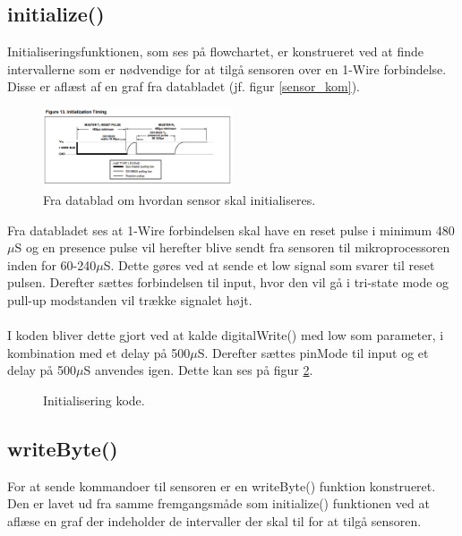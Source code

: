 \newpage
\subsection{initialize()}
Initialiseringsfunktionen, som ses på flowchartet, er konstrueret ved at finde intervallerne som er nødvendige for at tilgå sensoren over en 1-Wire forbindelse. Disse er aflæst af en graf fra databladet (jf. figur \ref{sensor_kom}).




\begin{figure}[h!]
  \centering
  \includegraphics[width=0.5\textwidth]{figures/Initialization_timing.png}
  \caption{Fra datablad om hvordan sensor skal initialiseres.}
  \label{sensor_init}
\end{figure}

Fra databladet ses at 1-Wire forbindelsen skal have en reset pulse i minimum 480$\mu$S og en presence pulse vil herefter blive sendt fra sensoren til mikroprocessoren inden for 60-240$\mu$S. Dette gøres ved at sende et low signal som svarer til reset pulsen. Derefter sættes forbindelsen til input, hvor den vil gå i tri-state mode og pull-up modstanden vil trække signalet højt. 
\\
\\
I koden bliver dette gjort ved at kalde digitalWrite() med low som parameter, i kombination med et delay på 500$\mu$S. Derefter sættes pinMode til input og et delay på 500$\mu$S anvendes igen. Dette kan ses på figur \ref{sensor_kode}.

\begin{figure}[h!]
  \centering
  \caption{Initialisering kode.}
  \label{sensor_kode}
\end{figure}

\subsection{writeByte()}
For at sende kommandoer til sensoren er en writeByte() funktion konstrueret. Den er lavet ud fra samme fremgangsmåde som initialize() funktionen ved at aflæse en graf der indeholder de intervaller der skal til for at tilgå sensoren.

